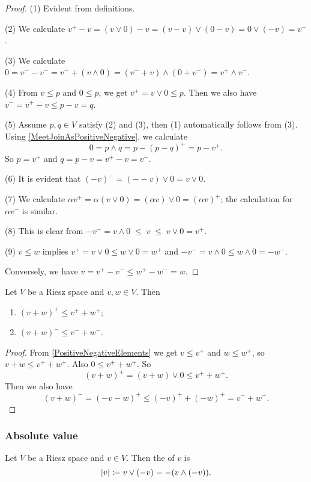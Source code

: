 \begin{proof}
(1) Evident from definitions.

(2) We calculate $v^+ - v = (v \vee 0) - v = (v-v) \vee (0-v) = 0\vee (-v) = v^-$.

(3) We calculate $0 = v^- - v^- = v^-  + (v\wedge 0) = (v^- + v)\wedge (0 + v^-) = v^+ \wedge v^-$.

(4) From $v\leq p$ and $0\leq p$, we get $v^+ = v \vee 0 \leq p$. Then we also have $v^- = v^+ - v \leq p - v = q$.

(5) Assume $p,q\in V$ satisfy (2) and (3), then (1) automatically follows from (3). Using \ref{MeetJoinAsPositiveNegative}, we calculate
\[ 0 = p\wedge q = p - (p-q)^+ = p - v^+. \]
So $p = v^+$ and $q = p - v = v^+ - v = v^-$.

(6) It is evident that $(-v)^- = (--v)\vee 0 = v\vee 0$.

(7) We calculate $\alpha v^+ = \alpha (v \vee 0) = (\alpha v) \vee 0 = (\alpha v)^+$; the calculation for $\alpha v^-$ is similar.

(8) This is clear from $-v^- = v\wedge 0 \;\leq\; v \;\leq\; v \vee 0 = v^+$.

(9) $v\leq w$ implies $v^+ = v\vee 0 \leq w\vee 0 = w^+$ and $-v^- = v\wedge 0 \leq w\wedge 0 = - w^-$.

Conversely, we have $v = v^+ - v^- \leq w^+ - w^- = w$.
\end{proof}


\begin{proposition} \label{triangleInequalityPositiveNegativeElements}
Let $V$ be a Riesz space and $v,w\in V$. Then
\begin{enumerate}
\item $(v+w)^+ \leq v^+ + w^+$;
\item $(v+w)^- \leq v^- + w^-$.
\end{enumerate}
\end{proposition}
\begin{proof}
From \ref{PositiveNegativeElements} we get $v \leq v^+$ and $w\leq w^+$, so $v+w \leq v^+ + w^+$. Also $0 \leq v^+ + w^+$. So
\[ (v+w)^+ = (v+w)\vee 0 \leq v^+ + w^+. \]
Then we also have
\[ (v+w)^- = (-v-w)^+ \leq (-v)^+ + (-w)^+ = v^- + w^-. \]
\end{proof}

\subsubsection{Absolute value}
\begin{definition}
Let $V$ be a Riesz space and $v\in V$. Then the  of $v$ is
\[ |v| \coloneqq v\vee (-v) = -(v\wedge (-v)). \]
\end{definition}

